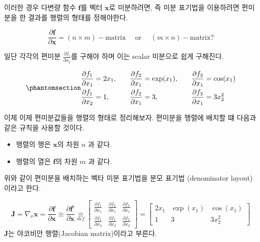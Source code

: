 \documentclass[
  11pt,
  a4paper,
  oneside]{scrbook}
\providecommand{\tightlist}{%
  \setlength{\itemsep}{0pt}\setlength{\parskip}{0pt}}\usepackage{longtable,booktabs,array}
\newcommand{\pardifftwo}[2]{\frac{\partial #1}{\partial #2 }}
\theoremstyle{definition}
\theoremstyle{plain}
\theoremstyle{definition}
\theoremstyle{definition}
\theoremstyle{remark}
\begin{document}
이러한 경우 다변량 함수 \(\pmb f\)를 벡터 \(\pmb x\)로 미분하려면, 즉
미분 표기법을 이용하려면 편미분을 한 결과를 행렬의 형태를 정해야한다.

\[  \pardifftwo{ \pmb f}{\pmb x} = (n \times m)-\text{matrix} \quad \text{ or }  \quad (m \times n)-\text{matrix}? \]

일단 각각의 편미분 \(\pardifftwo{f_i}{x_j}\)를 구해야 하며 이는 scalar
미분으로 쉽게 구해진다.

\begin{equation}\phantomsection\label{eq-par_deriv}{
\begin{aligned}
\pardifftwo{  f_1}{ x_1} & = 2x_1, & \quad \pardifftwo{  f_2}{ x_1} & = \exp(x_1), & \quad
\pardifftwo{  f_3}{ x_1} & = \cos(x_1) \\
\pardifftwo{  f_1}{ x_2} & = 1,    & \quad \pardifftwo{  f_2}{ x_1} & = 3,         & \quad
\pardifftwo{  f_3}{ x_1} & = 3 x_2^2 \\
\end{aligned}
}\end{equation}

이제 이제 편미분값들을 행렬의 형태로 정리해보자. 편미분을 행렬에 배치할
떄 다음과 같은 규칙을 사용할 것이다.

\begin{itemize}
\tightlist
\item
  행렬의 행은 \(\pmb x\)의 차원 \(n\) 과 같다.
\item
  행렬의 열은 \(\pmb f\)의 차원 \(m\) 과 같다.
\end{itemize}

위와 같이 편미분을 배치하는 벡타 미분 표기법을 분모 표기법 (denominator
layout)이라고 한다.

\begin{tcolorbox}[enhanced jigsaw, colback=white, title=\textcolor{quarto-callout-note-color}{\faInfo}\hspace{0.5em}{분모 표기법}, colbacktitle=quarto-callout-note-color!10!white, toprule=.15mm, breakable, bottomtitle=1mm, left=2mm, colframe=quarto-callout-note-color-frame, leftrule=.75mm, coltitle=black, toptitle=1mm, titlerule=0mm, arc=.35mm, opacityback=0, opacitybacktitle=0.6, rightrule=.15mm, bottomrule=.15mm]

\[ 
\pmb J = \nabla_x \pmb x =\pardifftwo{ \pmb f}{\pmb x}  \equiv \pardifftwo{ \pmb f^t}{\pmb x}
\underset{def}{\equiv} \begin{bmatrix}
\pardifftwo{  f_1}{ x_1} &  \pardifftwo{  f_2}{ x_1} &  \pardifftwo{  f_3}{ x_1}  \\
\pardifftwo{  f_1}{ x_2} &  \pardifftwo{  f_2}{ x_2}  &  \pardifftwo{  f_3}{ x_2} 
\end{bmatrix}
=  \begin{bmatrix}
2x_1 &  \exp(x_1)  &  \cos(x_1)   \\
1 &  3  &  3x_2^2
\end{bmatrix}
\] \(\pmb J\)는 야코비안 행렬(Jacobian matrix)이라고 부른다.

\end{tcolorbox}
\end{document}
